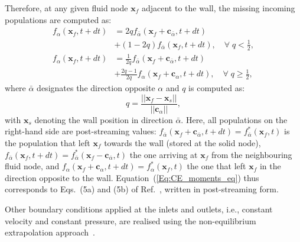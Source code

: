 Therefore, at any given fluid node $\bm{x}_f$ adjacent to the wall, the missing incoming populations are computed as:
\begin{subequations}
	\begin{align}
		f_\alpha(\bm{x}_f, t+dt) &= 2qf_{\bar{\alpha}}(\bm{x}_f+\bm{c}_{\bar{\alpha}}, t+dt)\nonumber \\  &+\left(1-2q\right)f_{\bar{\alpha}}(\bm{x}_f, t+dt), \quad \forall\; q<\frac{1}{2},\\
		f_\alpha(\bm{x}_f, t+dt) &= \frac{1}{2q}f_{\bar{\alpha}}(\bm{x}_f+\bm{c}_{\bar{\alpha}}, t+dt)\nonumber \\  &+\frac{2q-1}{2q}f_{\alpha}(\bm{x}_f+\bm{c}_{\alpha}, t+dt), \quad \forall\; q\geq\frac{1}{2},
		\end{align}
	\label{Eq:CE_moments_eq}
\end{subequations}
where $\bar{\alpha}$ designates the direction opposite $\alpha$ and $q$ is computed as:
\begin{equation}
    q = \frac{\lvert\lvert \bm{x}_f - \bm{x}_s\lvert\lvert}{\lvert\lvert\bm{c}_\alpha \lvert\lvert},
\end{equation}
with $\bm{x}_s$ denoting the wall position in direction $\bar{\alpha}$. Here, all populations on the right-hand side are post-streaming values: $f_{\bar{\alpha}}(\bm{x}_f+\bm{c}_{\bar{\alpha}}, t+dt)=f^*_{\bar{\alpha}}(\bm{x}_f,t)$ is the population that left $\bm{x}_f$ towards the wall (stored at the solid node), $f_{\bar{\alpha}}(\bm{x}_f, t+dt)=f^*_{\bar{\alpha}}(\bm{x}_f-\bm{c}_{\bar{\alpha}},t)$ the one arriving at $\bm{x}_f$ from the neighbouring fluid node, and $f_{\alpha}(\bm{x}_f+\bm{c}_{\alpha}, t+dt)=f^*_{\alpha}(\bm{x}_f,t)$ the one that left $\bm{x}_f$ in the direction opposite to the wall. Equation~(\ref{Eq:CE_moments_eq}) thus corresponds to Eqs.~(5a) and (5b) of Ref.~\cite{bouzidi2001momentum}, written in post-streaming form.

Other boundary conditions applied at the inlets and outlets, i.e., constant velocity and constant pressure, are realised using the non-equilibrium extrapolation approach~\cite{zhao2002non}.

